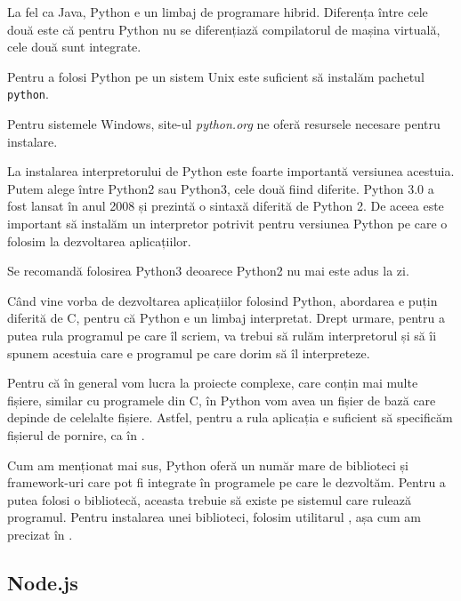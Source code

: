 La fel ca Java, Python e un limbaj de programare hibrid.
Diferența între cele două este că pentru Python nu se diferențiază compilatorul de mașina virtuală, cele două sunt integrate.

Pentru a folosi Python pe un sistem Unix este suficient să instalăm pachetul \texttt{python}.

Pentru sistemele Windows, site-ul \textit{python.org} ne oferă resursele necesare pentru instalare.

La instalarea interpretorului de Python este foarte importantă versiunea acestuia.
Putem alege între Python2 sau Python3, cele două fiind diferite.
Python 3.0 a fost lansat în anul 2008 și prezintă o sintaxă diferită de Python 2.
De aceea este important să instalăm un interpretor potrivit pentru versiunea Python pe care o folosim la dezvoltarea aplicațiilor.

Se recomandă folosirea Python3 deoarece Python2 nu mai este adus la zi.

Când vine vorba de dezvoltarea aplicațiilor folosind Python, abordarea e puțin diferită de C, pentru că Python e un limbaj interpretat.
Drept urmare, pentru a putea rula programul pe care îl scriem, va trebui să rulăm interpretorul și să îi spunem acestuia care e programul pe care dorim să îl interpreteze.

Pentru că în general vom lucra la proiecte complexe, care conțin mai multe fișiere, similar cu programele din C, în Python vom avea un fișier de bază care depinde de celelalte fișiere.
Astfel, pentru a rula aplicația e suficient să specificăm fișierul de pornire, ca în .


Cum am menționat mai sus, Python oferă un număr mare de biblioteci și framework-uri care pot fi integrate în programele pe care le dezvoltăm.
Pentru a putea folosi o bibliotecă, aceasta trebuie să existe pe sistemul care rulează programul.
Pentru instalarea unei biblioteci, folosim utilitarul , așa cum am precizat în .

\subsection{Node.js}
\label{sec:appdev:dev-env:js}

